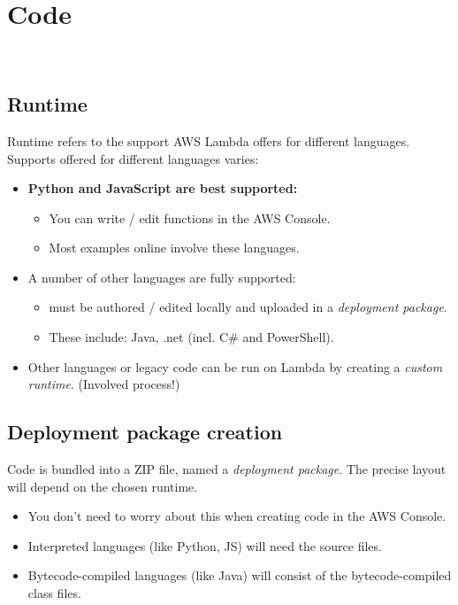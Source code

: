 \documentclass[slides]{pgnotes}
\begin{document}
\section{Code}\label{code}

~


\subsection{Runtime}\label{runtime}

Runtime refers to the support AWS Lambda offers for different languages.
Supports offered for different languages varies:

\begin{itemize}
\item
  \textbf{Python and JavaScript are best supported:}
  \begin{itemize}
  \item You can write / edit functions in the AWS Console.
  \item Most examples online involve these languages.
  \end{itemize}
\item
  A number of other languages are fully supported:
  \begin{itemize}
  \item must be authored / edited locally and uploaded in a \emph{deployment package}.
  \item These include: Java, .net (incl. C\# and PowerShell).
  \end{itemize}
\item
  Other languages or legacy code can be run on Lambda by creating a \emph{custom runtime}.
  (Involved process!)
\end{itemize}

\subsection{Deployment package creation}\label{deployment-package-creation}

Code is bundled into a ZIP file, named a \emph{deployment package}. The
precise layout will depend on the chosen runtime.

\begin{itemize}
\item
  You don't need to worry about this when creating code in the AWS Console.
\item
  Interpreted languages (like Python, JS) will need the source files.
\item
  Bytecode-compiled languages (like Java) will consist of the
  bytecode-compiled class files.
\end{itemize}
\end{document}
